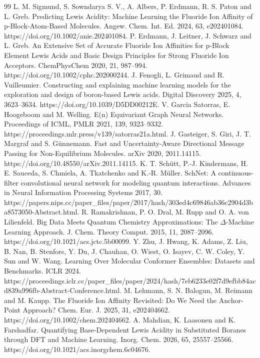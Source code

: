 \begin{thebibliography}{99}
 L. M. Sigmund, S. Sowndarya S. V., A. Albers, P. Erdmann, R. S. Paton and L. Greb. Predicting Lewis Acidity: Machine Learning the Fluoride Ion Affinity of p-Block-Atom-Based Molecules. Angew. Chem. Int. Ed. 2024, 63, e202401084. https://doi.org/10.1002/anie.202401084.
 P. Erdmann, J. Leitner, J. Schwarz and L. Greb. An Extensive Set of Accurate Fluoride Ion Affinities for p-Block Element Lewis Acids and Basic Design Principles for Strong Fluoride Ion Acceptors. ChemPhysChem 2020, 21, 987--994. https://doi.org/10.1002/cphc.202000244.
 J. Fenogli, L. Grimaud and R. Vuilleumier. Constructing and explaining machine learning models for the exploration and design of boron-based Lewis acids. Digital Discovery 2025, 4, 3623--3634. https://doi.org/10.1039/D5DD00212E.
 V. Garcia Satorras, E. Hoogeboom and M. Welling. E(n) Equivariant Graph Neural Networks. Proceedings of ICML, PMLR 2021, 139, 9323--9332. https://proceedings.mlr.press/v139/satorras21a.html.
 J. Gasteiger, S. Giri, J. T. Margraf and S. Günnemann. Fast and Uncertainty-Aware Directional Message Passing for Non-Equilibrium Molecules. arXiv 2020, 2011.14115. https://doi.org/10.48550/arXiv.2011.14115.
 K. T. Schütt, P.-J. Kindermans, H. E. Sauceda, S. Chmiela, A. Tkatchenko and K.-R. Müller. SchNet: A continuous-filter convolutional neural network for modeling quantum interactions. Advances in Neural Information Processing Systems 2017, 30. https://papers.nips.cc/paper\_files/paper/2017/hash/303ed4c69846ab36c2904d3ba8573050-Abstract.html.
 R. Ramakrishnan, P. O. Dral, M. Rupp and O. A. von Lilienfeld. Big Data Meets Quantum Chemistry Approximations: The $\Delta$-Machine Learning Approach. J. Chem. Theory Comput. 2015, 11, 2087--2096. https://doi.org/10.1021/acs.jctc.5b00099.
 Y. Zhu, J. Hwang, K. Adams, Z. Liu, B. Nan, B. Stenfors, Y. Du, J. Chauhan, O. Wiest, O. Isayev, C. W. Coley, Y. Sun and W. Wang. Learning Over Molecular Conformer Ensembles: Datasets and Benchmarks. ICLR 2024. https://proceedings.iclr.cc/paper\_files/paper/2024/hash/7eb6233e02f7d9efbb84acd839a996fb-Abstract-Conference.html.
 M. Lehmann, S. N. Balogun, M. Reimann and M. Kaupp. The Fluoride Ion Affinity Revisited: Do We Need the Anchor-Point Approach? Chem. Eur. J. 2025, 31, e202404662. https://doi.org/10.1002/chem.202404662.
 A. Mahdian, K. Laasonen and K. Farshadfar. Quantifying Base-Dependent Lewis Acidity in Substituted Boranes through DFT and Machine Learning. Inorg. Chem. 2026, 65, 25557--25566. https://doi.org/10.1021/acs.inorgchem.6c04676.

\end{thebibliography}
